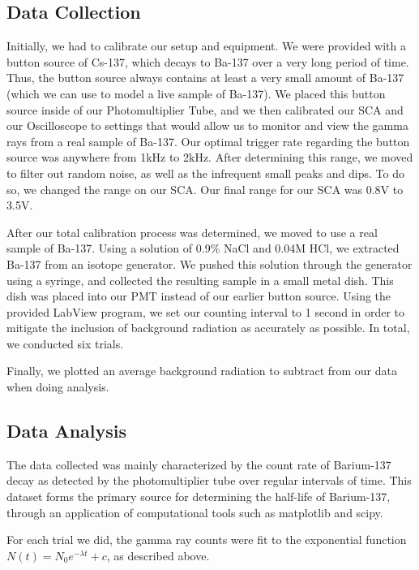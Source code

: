 \documentclass[10pt,letterpaper,onecolumn]{article}
\begin{document}
\subsection{Data Collection}

Initially, we had to calibrate our setup and equipment. We were provided with a 
button source of Cs-137, which decays to Ba-137 over a very long period of time. 
Thus, the button source always contains at least a very small amount of Ba-137 (which
we can use to model a live sample of Ba-137). We placed this button source inside of
our Photomultiplier Tube, and we then calibrated our SCA and our Oscilloscope to
settings that would allow us to monitor and view the gamma rays from a real sample
of Ba-137. Our optimal trigger rate regarding the button source was anywhere from 1kHz
to 2kHz. After determining this range, we moved to filter out random noise, as well as
the infrequent small peaks and dips. To do so, we changed the range on our SCA. Our 
final range for our SCA was 0.8V to 3.5V.

After our total calibration process was determined, we moved to use a real sample of
Ba-137. Using a solution of 0.9\% NaCl and 0.04M HCl, we extracted Ba-137 from an
isotope generator. We pushed this solution through the generator using a syringe,
and collected the resulting sample in a small metal dish. This dish was placed into
our PMT instead of our earlier button source. Using the provided LabView program, we set
our counting interval to 1 second in order to mitigate the inclusion of background radiation
as accurately as possible. In total, we conducted six trials.

Finally, we plotted an average background radiation to subtract from our data when 
doing analysis.




\subsection{Data Analysis}

The data collected was mainly characterized by the count rate of Barium-137 
decay as detected by the photomultiplier tube over regular intervals of time. 
This dataset forms the primary source for determining the half-life of 
Barium-137, through an application of computational tools such as matplotlib
and scipy.

For each trial we did, the gamma ray counts were fit to the exponential function 
$N(t) = N_0e^{-\lambda t} + c$, as described above.
\end{document}
